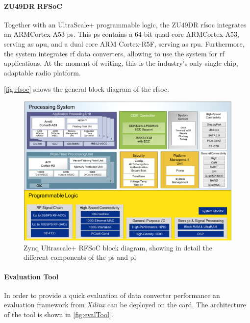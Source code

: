 \paragraph{ZU49DR RFSoC}
Together with an UltraScale+ programmable logic, the ZU49DR \gls{rfsoc} integrates an ARM\textregistered Cortex\texttrademark-A53 \gls{ps}.
This \gls{ps} contains a 64-bit quad-core ARM\textregistered Cortex\texttrademark-A53, serving as \gls{apu}, and a dual core ARM Cortex-R5F, serving as \gls{rpu}.
Furthermore, the system integrates \gls{rf} data converters, allowing to use the system for \gls{rf} applications.
At the moment of writing, this is the industry's only single-chip, adaptable radio platform. \cite{zu49}

\autoref{fig:rfsoc} shows the general block diagram of the \gls{rfsoc}.

\begin{figure}[tb]
	\centering
	\includegraphics[width = \textwidth]{chap/05-readout/img/rfsoc_blockdiagram}
	\caption[Zynq Ultrascale+ RFSoC block diagram]{Zynq Ultrascale+ RFSoC block diagram, showing in detail the different components of the \gls{ps} and \gls{pl}}
	\label{fig:rfsoc}
\end{figure}


\paragraph{Evaluation Tool}
In order to provide a quick evaluation of data converter performance an evaluation framework from \textit{Xilinx} can be deployed on the card. 
The architecture of the tool is shown in \autoref{fig:evalTool}. \cite{zcu216evaltool}

